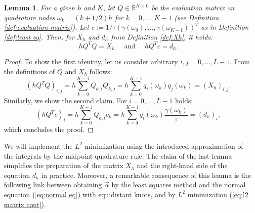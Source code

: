 \documentclass[a4paper,11pt,bibliography=totoc,listof=totoc,headinclude=true,cleardoublepage=empty,oneside]{scrbook}
\newtheorem{lemma}[theorem]{Lemma}
\newcommand{\R}{\mathbb{R}}
\renewcommand{\eqref}[1]{(\ref{#1})}
\begin{document}
    
\begin{lemma}\label{lemma:QTQ}
    For a given $h$ and $K$, let $Q \in \R^{K\times L}$ be the evaluation matrix on quadrature nodes $\omega_k = (k+1/2)h$ for $k = 0, \dots, K-1$ (see Definition \ref{def:evaluation matrix}). Let $c := 1/\tau \left(\gamma(\omega_0), \dots, \gamma(\omega_{K-1})\right)^T$ as in Definition \ref{def:least sq}.
    Then, for $X_h$ and $d_h$ from Definition \ref{def:Xh}, it holds: 
    \begin{equation*}\label{eq:link QTQ=X}
        h Q^T Q = X_h \quad \text{ and } \quad h Q^Tc = d_h.
    \end{equation*}
\end{lemma}
\begin{proof}
    To show the first identity, let us consider arbitrary $i, j = 0, \dots, L-1$. From the definitions of $Q$ and $X_h$ follows:
    \begin{equation*}
        \left(hQ^TQ\right)_{i,j} =  h \sum_{k=0}^{K-1} Q_{k,i} Q_{k,j} = h \sum_{k=0}^{K-1} q_i(\omega_k)q_j(\omega_k) = (X_h)_{i,j}.
    \end{equation*}
    Similarly, we show the second claim. For $i = 0, \dots, L-1$ holds:
    \begin{equation*}
        \left(hQ^T c\right)_i = h \sum_{k=0}^{K-1} Q_{k,i}c_k = h\sum_{k=0}^{K-1} q_i(\omega_k) \frac{\gamma(\omega_k)}{\tau} = \left(d_h\right)_i,
    \end{equation*}
    which concludes the proof.
\end{proof}

We will implement the $L^2$ minimization using the introduced approximation of the integrals by the midpoint quadrature rule. The claim of the last lemma simplifies the preparation of the matrix $X_h$ and the right-hand side of the equation $d_h$ in practice. Moreover, a remarkable consequence of this lemma is the following link between obtaining $\Vec{\alpha}$ by the least squares method and the normal equation \eqref{eq:normal eq} with equidistant knots, and by $L^2$ minimization \eqref{eq:l2 matrix cont}.
\end{document}
